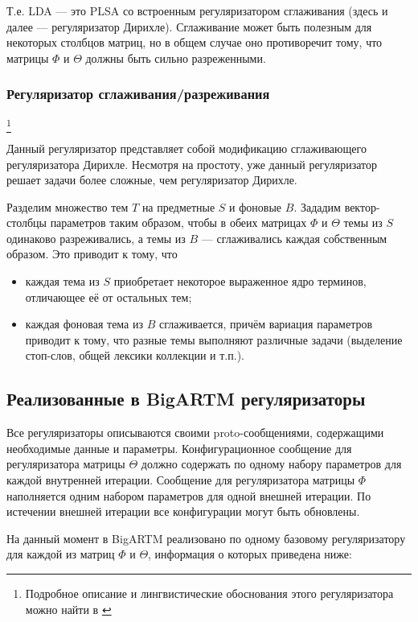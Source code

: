 Т.е. LDA --- это PLSA со встроенным регуляризатором сглаживания (здесь и далее --- регуляризатор Дирихле). Сглаживание может быть полезным для некоторых столбцов матриц, но в общем случае оно противоречит тому, что матрицы $\Phi$ и $\Theta$ должны быть сильно разреженными. 

\subsubsection{Регуляризатор сглаживания/разреживания}
\footnote{Подробное описание и лингвистические обоснования этого регуляризатора можно найти в \cite{voron_potap_14}}

 Данный регуляризатор представляет собой модификацию сглаживающего регуляризатора Дирихле. Несмотря на простоту, уже данный регуляризатор решает задачи более сложные, чем регуляризатор Дирихле.

Разделим множество тем $T$ на предметные $S$ и фоновые $B$. Зададим вектор-столбцы параметров таким образом, чтобы в обеих матрицах $\Phi$ и $\Theta$ темы из $S$ одинаково разреживались, а темы из $B$ --- сглаживались каждая собственным образом. Это приводит к тому, что 

\begin{itemize}
	\item каждая тема из $S$ приобретает некоторое выраженное ядро терминов, отличающее её от остальных тем;
	\item каждая фоновая тема из $B$ сглаживается, причём вариация параметров приводит к тому, что разные темы выполняют различные задачи (выделение стоп-слов, общей лексики коллекции и т.п.).
\end{itemize}  

\subsection{Реализованные в BigARTM регуляризаторы}

Все регуляризаторы описываются своими proto-сообщениями, содержащими необходимые данные и параметры. Конфигурационное сообщение для регуляризатора матрицы $\Theta$ должно содержать по одному набору параметров для каждой внутренней итерации. Сообщение для регуляризатора матрицы $\Phi$ наполняется одним набором параметров для одной внешней итерации. По истечении внешней итерации все конфигурации могут быть обновлены.

На данный момент в BigARTM реализовано по одному базовому регуляризатору для каждой из матриц $\Phi$ и $\Theta$, информация о которых приведена ниже:

